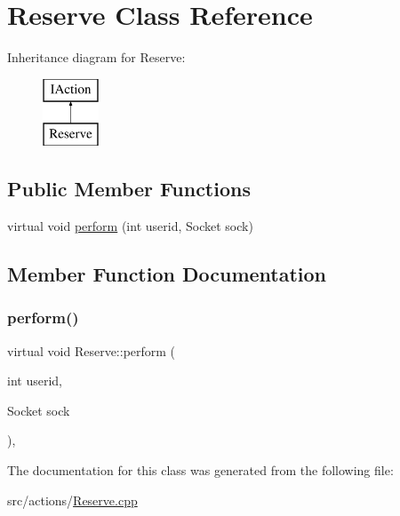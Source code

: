 \hypertarget{class_reserve}{}\section{Reserve Class Reference}
\label{class_reserve}
Inheritance diagram for Reserve\+:\begin{figure}[H]
\begin{center}
\leavevmode
\includegraphics[height=2.000000cm]{class_reserve}
\end{center}
\end{figure}
\subsection*{Public Member Functions}
\begin{DoxyCompactItemize}
\item 
virtual void \mbox{\hyperlink{class_reserve_aa681b8b419edc579ba2892fc43fe3585}{perform}} (int userid, Socket sock)
\end{DoxyCompactItemize}


\subsection{Member Function Documentation}
\mbox{\label{class_reserve_aa681b8b419edc579ba2892fc43fe3585}} 
\subsubsection{\texorpdfstring{perform()}{perform()}}
{\footnotesize\ttfamily virtual void Reserve\+::perform (\begin{DoxyParamCaption}\item[{int}]{userid,  }\item[{Socket}]{sock }\end{DoxyParamCaption})\hspace{0.3cm}{\ttfamily [inline]}, {\ttfamily [virtual]}}



The documentation for this class was generated from the following file\+:\begin{DoxyCompactItemize}
\item 
src/actions/\mbox{\hyperlink{_reserve_8cpp}{Reserve.\+cpp}}\end{DoxyCompactItemize}
